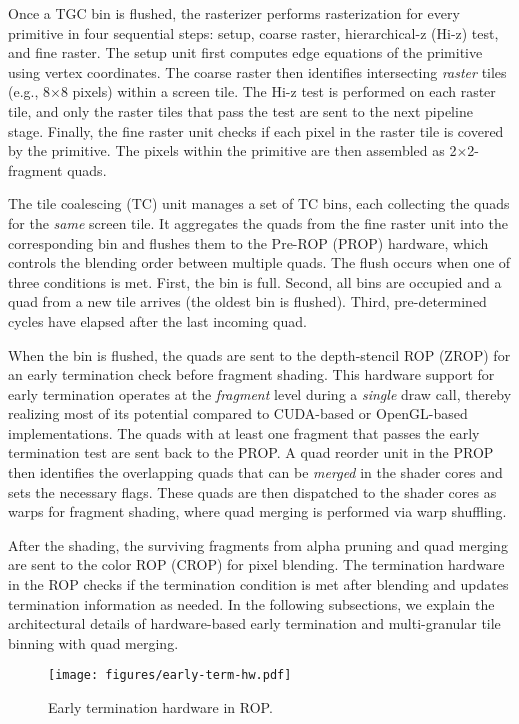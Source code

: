 Once a TGC bin is flushed, the rasterizer performs rasterization for every
primitive in four sequential steps: setup, coarse raster, hierarchical-z (Hi-z)
test, and fine raster.
%
The setup unit first computes edge equations of the primitive using vertex
coordinates. The coarse raster then identifies intersecting \emph{raster} tiles
(e.g., 8$\times$8 pixels) within a screen tile.
%
The Hi-z test is performed on each raster tile, and only the raster tiles that
pass the test are sent to the next pipeline stage.
%
Finally, the fine raster unit checks if each pixel in the raster tile is
covered by the primitive. The pixels within the primitive are then assembled as
2$\times$2-fragment quads.

The tile coalescing (TC) unit manages a set of TC bins, each collecting the
quads for the \emph{same} screen tile.
%
It aggregates the quads from the fine raster unit into the corresponding bin
and flushes them to the Pre-ROP (PROP) hardware, which controls the blending
order between multiple quads. The flush occurs when one of three conditions is
met.
%
First, the bin is full.
%
Second, all bins are occupied and a quad from a new tile arrives (the oldest
bin is flushed).
%
Third, pre-determined cycles have elapsed after the last incoming quad.

When the bin is flushed, the quads are sent to the depth-stencil ROP (ZROP) for
an early termination check before fragment shading.
%
This hardware support for early termination operates at the \emph{fragment}
level during a \emph{single} draw call, thereby realizing most of its potential
compared to CUDA-based or OpenGL-based implementations.
%
The quads with at least one fragment that passes the early termination test are
sent back to the PROP. A quad reorder unit in the PROP then identifies the
overlapping quads that can be \emph{merged} in the shader cores and sets the
necessary flags. These quads are then dispatched to the shader cores as warps
for fragment shading, where quad merging is performed via warp shuffling.

After the shading, the surviving fragments from alpha pruning and quad merging
are sent to the color ROP (CROP) for pixel blending.
%
The termination hardware in the ROP checks if the termination condition is met
after blending and updates termination information as needed.
%
In the following subsections, we explain the architectural details of
hardware-based early termination and multi-granular tile binning with quad
merging.

\begin{figure}[t]
  \centering
  \texttt{[image: figures/early-term-hw.pdf]}
  \caption{Early termination hardware in ROP.}
  \vspace{-0.20in}
  \label{fig:early-term-hw}
\end{figure}

